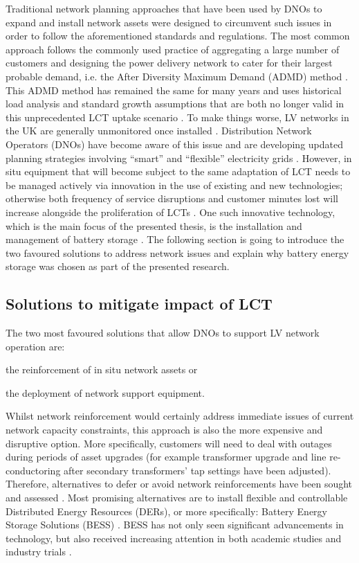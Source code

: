 Traditional network planning approaches that have been used by DNOs to expand and install network assets were designed to circumvent such issues in order to follow the aforementioned standards and regulations.
The most common approach follows the commonly used practice of aggregating a large number of customers and designing the power delivery network to cater for their largest probable demand, i.e. the After Diversity Maximum Demand (ADMD) method \cite{Richardson2010a}.
This ADMD method has remained the same for many years and uses historical load analysis and standard growth assumptions that are both no longer valid in this unprecedented LCT uptake scenario \cite{Yunusov2016}.
To make things worse, LV networks in the UK are generally unmonitored once installed \cite{Yunusov2016}.
Distribution Network Operators (DNOs) have become aware of this issue and are developing updated planning strategies involving ``smart'' and ``flexible'' electricity grids \cite{Fang2012}.
However, in situ equipment that will become subject to the same adaptation of LCT needs to be managed actively via innovation in the use of existing and new technologies; otherwise both frequency of service disruptions and customer minutes lost will increase alongside the proliferation of LCTs \cite{Ault2008a}.
One such innovative technology, which is the main focus of the presented thesis, is the installation and management of battery storage \cite{Chen2009}.
The following section is going to introduce the two favoured solutions to address network issues and explain why battery energy storage was chosen as part of the presented research.


\subsection{Solutions to mitigate impact of LCT}
\label{ch-introduction:subsec:solutions-to-mitigate-impact-of-lct}

The two most favoured solutions that allow DNOs to support LV network operation are:
\begin{enumerate*}
	\item the reinforcement of in situ network assets or
	\item the deployment of network support equipment.
\end{enumerate*}
Whilst network reinforcement would certainly address immediate issues of current network capacity constraints, this approach is also the more expensive and disruptive option.
More specifically, customers will need to deal with outages during periods of asset upgrades (for example transformer upgrade and line re-conductoring after secondary transformers' tap settings have been adjusted).
Therefore, alternatives to defer or avoid network reinforcements have been sought and assessed \cite{Harrison2007, Zangs2016a, VanderKlauw2016d, Greenwood2017}.
Most promising alternatives are to install flexible and controllable Distributed Energy Resources (DERs), or more specifically: Battery Energy Storage Solutions (BESS) \cite{Wade2010}.
BESS has not only seen significant advancements in technology, but also received increasing attention in both academic studies and industry trials \cite{Palizban2016}.

